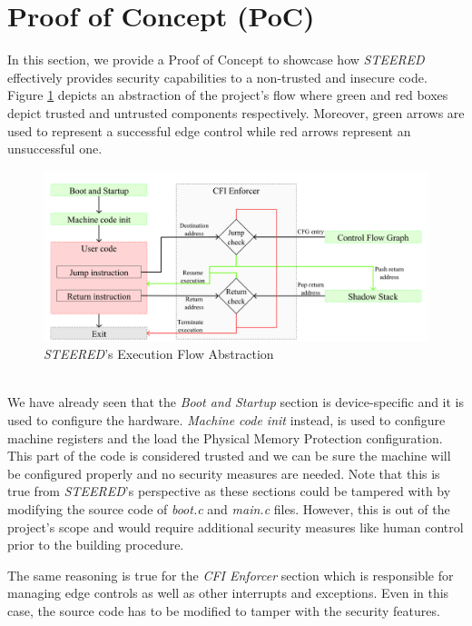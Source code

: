 \section{Proof of Concept (PoC)}
\label{sec:project_poc}

In this section, we provide a Proof of Concept to showcase how \textit{STEERED} effectively
provides security capabilities to a non-trusted and insecure code. Figure
\ref{fig:functioning} depicts an abstraction of the project's flow where green
and red boxes depict trusted and untrusted components respectively. Moreover,
green arrows are used to represent a successful edge control while red arrows
represent an unsuccessful one. \\
\begin{figure}[htbp]
  \centering
  \includegraphics[width=.9\linewidth]{images/functioning.png}
  \caption{\textit{STEERED}'s Execution Flow Abstraction}
  \label{fig:functioning}
\end{figure}
\\

We have already seen that the \textit{Boot and Startup} section is device-specific
and it is used to configure the hardware. \textit{Machine code init} instead, is
used to configure machine registers and the load the Physical Memory Protection
configuration. This part of the code is considered trusted and we can be sure the
machine will be configured properly and no security measures are needed. Note
that this is true from \textit{STEERED}'s perspective as these sections could be
tampered with by modifying the source code of \textit{boot.c} and \textit{main.c}
files. However, this is out of the project's scope and would require additional security
measures like human control prior to the building procedure.

The same reasoning is true for the \textit{CFI Enforcer} section which is
responsible for managing edge controls as well as other interrupts and
exceptions. Even in this case, the source code has to be modified to tamper with
the security features.

